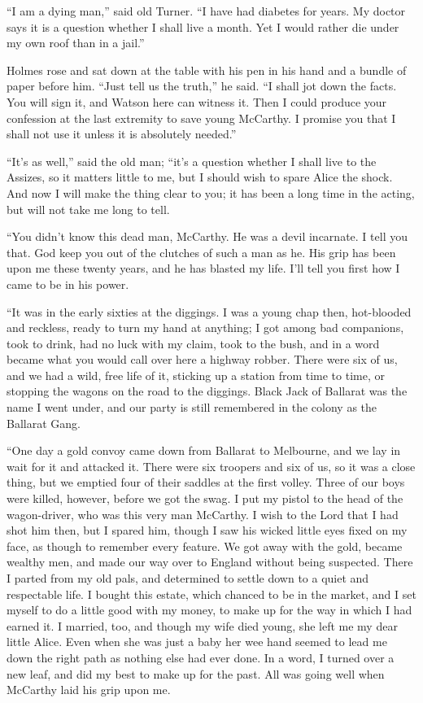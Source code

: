 “I am a dying man,” said old Turner. “I have had diabetes
for years. My doctor says it is a question whether I
shall live a month. Yet I would rather die under my own
roof than in a jail.”

Holmes rose and sat down at the table with his pen in his
hand and a bundle of paper before him. “Just tell us the
truth,” he said. “I shall jot down the facts. You will sign
it, and Watson here can witness it. Then I could produce
your confession at the last extremity to save young McCarthy.
I promise you that I shall not use it unless it is absolutely
needed.”

“It’s as well,” said the old man; “it’s a question whether
I shall live to the Assizes, so it matters little to me, but I
should wish to spare Alice the shock. And now I will make
the thing clear to you; it has been a long time in the acting,
but will not take me long to tell.

“You didn’t know this dead man, McCarthy. He was a
devil incarnate. I tell you that. God keep you out of the
clutches of such a man as he. His grip has been upon me
these twenty years, and he has blasted my life. I’ll tell you
first how I came to be in his power.

“It was in the early sixties at the diggings. I was a young
chap then, hot-blooded and reckless, ready to turn my hand
at anything; I got among bad companions, took to drink, had
no luck with my claim, took to the bush, and in a word became
what you would call over here a highway robber. There
were six of us, and we had a wild, free life of it, sticking up a
station from time to time, or stopping the wagons on the road
to the diggings. Black Jack of Ballarat was the name I went
under, and our party is still remembered in the colony as the
Ballarat Gang.

“One day a gold convoy came down from Ballarat to Melbourne,
and we lay in wait for it and attacked it. There were
six troopers and six of us, so it was a close thing, but we emptied
four of their saddles at the first volley. Three of our
boys were killed, however, before we got the swag. I put my
pistol to the head of the wagon-driver, who was this very man
McCarthy. I wish to the Lord that I had shot him then, but
I spared him, though I saw his wicked little eyes fixed on my
face, as though to remember every feature. We got away with
the gold, became wealthy men, and made our way over to
England without being suspected. There I parted from my
old pals, and determined to settle down to a quiet and respectable
life. I bought this estate, which chanced to be in the
market, and I set myself to do a little good with my money,
to make up for the way in which I had earned it. I married,
too, and though my wife died young, she left me my dear little
Alice. Even when she was just a baby her wee hand seemed
to lead me down the right path as nothing else had ever done.
In a word, I turned over a new leaf, and did my best to make
up for the past. All was going well when McCarthy laid his
grip upon me.

